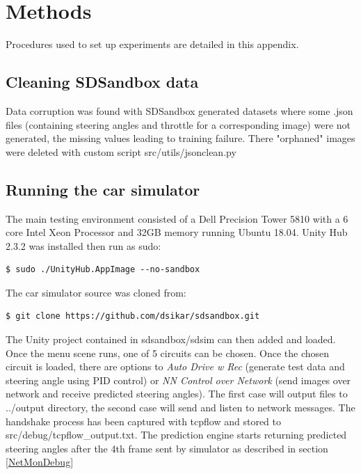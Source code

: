 \label{AppendixA-methods} %
\chapter{Methods} %

Procedures used to set up experiments are detailed in this appendix.

\section{Cleaning SDSandbox data}

Data corruption was found with SDSandbox generated datasets where some .json files (containing steering angles and throttle for a corresponding image)  were not generated, the missing values leading to training failure. There "orphaned" images were deleted with custom script src/utils/jsonclean.py

\section{Running the car simulator}
\label{RunningCarSimulatorForInference}

The main testing environment consisted of a Dell Precision Tower 5810 with a 6 core Intel Xeon Processor and 32GB memory running Ubuntu 18.04. Unity Hub 2.3.2 was installed then run as sudo:
\begin{verbatim}
$ sudo ./UnityHub.AppImage --no-sandbox 
\end{verbatim}
The car simulator source was cloned from:
\begin{verbatim}
$ git clone https://github.com/dsikar/sdsandbox.git    
\end{verbatim}
The Unity project contained in sdsandbox/sdsim can then added and loaded.
Once the menu scene runs, one of 5 circuits can be chosen. Once the chosen circuit is loaded, there are options to \textit{Auto Drive w Rec} (generate test data and steering angle using PID control) or \textit{NN Control over Network} (send images over network and receive predicted steering angles). The first case will output files to ../output directory, the second case will send and listen to network messages. The handshake process has been captured with tcpflow and stored to  src/debug/tcpflow\_output.txt. The prediction engine starts returning predicted steering angles after the 4th frame sent by simulator as described in section \ref{NetMonDebug}

